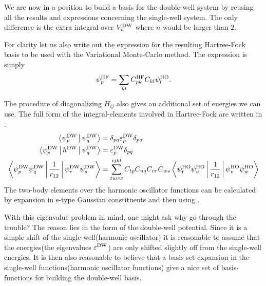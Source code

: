     We are now in a position to build a basis for the double-well system by
    reusing all the results and expressions concerning the single-well system.
    The only difference is the extra integral over $V^{\text{DW}}_n$ where $n$ would be
    larger than $2$.

    For clarity let us also write out the expression for the resulting
    Hartree-Fock basis to be used with the Variational Monte-Carlo method. The
    expression is simply
        \begin{equation}
            \psi^{\text{HF}}_p = \sum\limits_{kl} C^{\text{HF}}_{pk}C_{kl}\psi^{\text{HO}}_l.
        \end{equation}

    The procedure of diagonalizing $H_{ij}$ also gives an additional set of
    energies we can use. The full form of the integral-elements involved in
    Hartree-Fock are written in .
        \begin{equation}
            \begin{aligned}
                \Braket{\psiDW_p|\psiDW_q} &= \delta_{pq}
                \varepsilon^{\text{DW}}_p\delta_{pq} \\
                \Braket{\psiDW_p|h^{\text{DW}}|\psiDW_q} &=
                \varepsilon^{\text{DW}}_p\delta_{pq} \\
                \Braket{\psiDW_p\psiDW_q|\frac{1}{r_{12}}|\psiDW_r\psiDW_s} &=
                \suml{tuvw}{ijkl} C_{tp}C_{uq}C_{vr}C_{ws}
                \Braket{\psiHO_t\psiHO_u|\frac{1}{r_{12}}|\psiHO_v\psiHO_w}
            \end{aligned}
            \label{eq:fullfinalsumary}
        \end{equation}
    The two-body elements over the harmonic oscillator functions can be
    calculated by expansion in s-type Gaussian constituents and then using
    .

    With this eigenvalue problem in mind, one might ask why go through the
    trouble? The reason lies in the form of the double-well potential. Since it
    is a simple shift of the single-well(harmonic oscillator) it is reasonable
    to assume that the energies(the eigenvalues $\varepsilon^{\text{DW}}$) are only
    shifted slightly off from the single-well energies. It is then also
    reasonable to believe that a basis set expansion in the single-well
    functions(harmonic oscillator functions) give a nice set of basis-functions
    for building the double-well basis.

